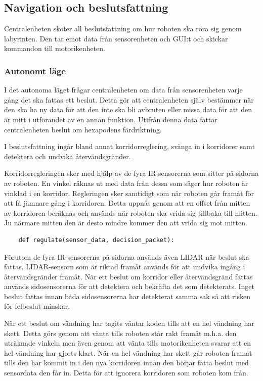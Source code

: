 \documentclass[a4paper,titlepage,12pt]{article}
\begin{document}
	\subsection{Navigation och beslutsfattning}
	Centralenheten sköter all beslutsfattning om hur roboten ska röra sig
	genom labyrinten. Den tar emot data från sensorenheten och GUI:t och
	skickar kommandon till motorikenheten.
  
	\subsubsection{Autonomt läge}
	I det autonoma läget frågar centralenheten om data från sensorenheten
    varje gång det ska fattas ett beslut. Detta gör att centralenheten själv
    bestämmer när den ska ha ny data för att den inte ska bli avbruten eller missa
    data för att den är mitt i utförandet av en annan funktion. Utifrån denna data
    fattar centralenheten beslut om hexapodens färdriktning.

    I beslutsfattning ingår bland annat korridorreglering, svänga in i korridorer samt detektera
    och undvika återvändsgränder.

    Korridorregleringen sker med hjälp av de fyra IR-sensorerna som sitter på
    sidorna av roboten. En vinkel räknas ut med data från dessa som säger
    hur roboten är vinklad i en korridor. Regleringen sker samtidigt som när
    roboten går framåt för att få jämnare gång i korridoren. Detta uppnås genom
    att en offset från mitten av korridoren beräknas och används när roboten ska
    vrida sig tillbaka till mitten. Ju närmare mitten den är desto mindre kommer
    den att vrida sig mot mitten.

    \begin{lstlisting}
    def regulate(sensor_data, decision_packet):
    \end{lstlisting}

    Förutom de fyra IR-sensorerna på sidorna används även LIDAR när beslut ska fattas. LIDAR-sensorn som är riktad framåt används
    för att undvika ingång i återvändsgränder framåt. När ett beslut om korridor
    eller återvändsgränd fattas används sidosensorerna för att detektera och
    bekräfta det som detekterats. Inget beslut fattas innan båda sidosensorerna
    har detekterat samma sak så att risken för felbeslut minskar.

    När ett beslut om vändning har tagits väntar koden tills att en hel vändning
    har skett. Detta görs genom att vänta tills roboten står rakt framåt m.h.a.
    den uträknade vinkeln men även genom att vänta tills motorikenheten svarar
    att en hel vändning har gjorts klart. När en hel vändning har skett går
    roboten framåt tills den har kommit in i den nya korridoren innan den börjar
    fatta beslut med sensordata den får in. Detta för att ignorera korridoren
    som roboten kom från. 
    
\end{document}
